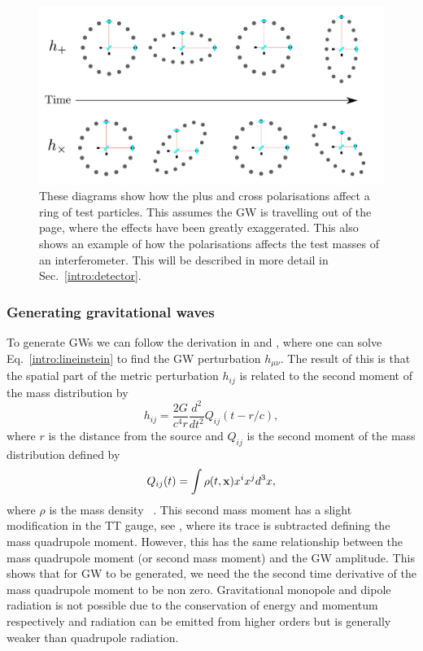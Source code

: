 \begin{figure}[h]
    \centering
    \includegraphics[width=\textwidth]{C1_intro/polarisation_ring.pdf}
 \caption[Plus and Cross polarisations]{These diagrams show how the plus and cross
polarisations affect a ring of test particles. This assumes
the \gls{GW} is travelling out of the page, where the effects
have been greatly exaggerated. This also shows an example of how the polarisations
affects the test masses of an interferometer. This will be
described in more detail in Sec.~\ref{intro:detector}.}
\label{gw:polarisations}
\end{figure}



\subsubsection{Generating gravitational waves}

To generate \glspl{GW} we can follow the derivation in \citep{flanagan2005BasicsGravitational} and \citep{letiec2016TheoryGravitational}, where one can solve Eq.~\ref{intro:lineinstein} to find the \gls{GW} perturbation $h_{\mu \nu}$.
The result of this is that the spatial part of the metric perturbation $h_{i j}$ is related to the second moment of the mass distribution by
\begin{equation}
    \label{intro:gravwave:amp}
        h_{ij} = \frac{2G}{c^4 r}  \frac{d^2}{dt^2} Q_{ij}(t-r/c),
\end{equation}
where $r$ is the distance from the source \citep{letiec2016TheoryGravitational} and $Q_{i j}$ is the second moment of the mass distribution defined by 
\begin{equation}
    Q_{ij}(t) = \int \rho(t,{\bf x})  x^i x^j d^3x,
\end{equation}
where $\rho$ is the mass density ~\citep{letiec2016TheoryGravitational}.  
This second mass moment has a slight modification in the TT gauge, see
\citep{flanagan2005BasicsGravitational}, where its trace is subtracted defining the mass quadrupole moment. 
However, this has the same relationship between the mass quadrupole moment (or second mass moment) and the \gls{GW} amplitude.  This shows that for \gls{GW} to be generated, we need the the second time derivative of the mass quadrupole moment to be non zero. 
Gravitational monopole and dipole radiation is not possible due to the conservation of energy and momentum respectively \citep{misner1973Gravitation} and radiation can be emitted from higher orders but is generally weaker than quadrupole radiation. 

